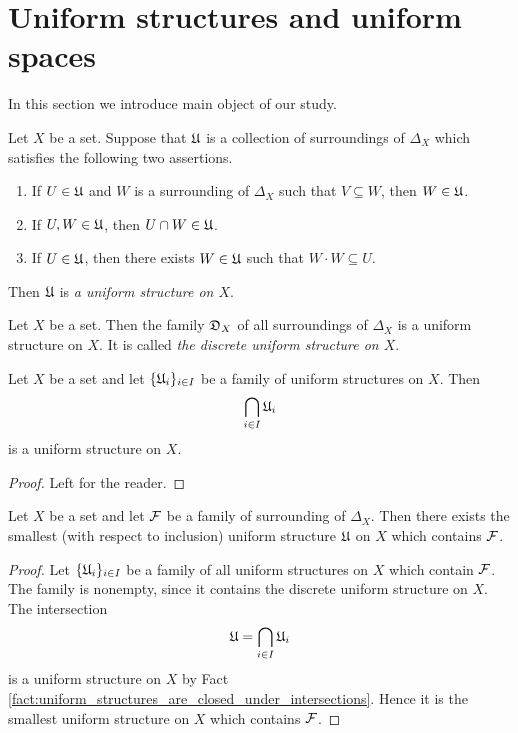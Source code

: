 \section{Uniform structures and uniform spaces}
\noindent
In this section we introduce main object of our study.

\begin{definition}
Let $X$ be a set. Suppose that ${\mathfrak U}$ is a collection of surroundings of $\Delta_X$ which satisfies the following two assertions.
\begin{enumerate}[label=\textbf{(\arabic*)}, leftmargin=*]
\item If $U \in {\mathfrak U}$ and $W$ is a surrounding of $\Delta_X$ such that $V\subseteq W$, then $W\in {\mathfrak U}$.
\item If $U,W\in {\mathfrak U}$, then $U\cap W \in {\mathfrak U}$. 
\item If $U \in {\mathfrak U}$, then there exists $W\in {\mathfrak U}$ such that $W\cdot W \subseteq U$.
\end{enumerate}
Then ${\mathfrak U}$ is \textit{a uniform structure on $X$}.
\end{definition}

\begin{example}\label{example:discrete_uniform_structure}
Let $X$ be a set. Then the family ${\mathfrak D}_X$ of all surroundings of $\Delta_X$ is a uniform structure on $X$. It is called \textit{the discrete uniform structure on $X$}.
\end{example}

\begin{fact}\label{fact:uniform_structures_are_closed_under_intersections}
Let $X$ be a set and let $\{{\mathfrak U}_i\}_{i\in I}$ be a family of uniform structures on $X$. Then 
$$\bigcap_{i\in I}{\mathfrak U}_i$$
is a uniform structure on $X$.
\end{fact}
\begin{proof}
Left for the reader.
\end{proof}

\begin{corollary}\label{corollary:smallest_uniform_structure_containing_given_family_of_surroundings}
Let $X$ be a set and let ${\mathcal F}$ be a family of surrounding of $\Delta_X$. Then there exists the smallest (with respect to inclusion) uniform structure ${\mathfrak U}$ on $X$ which contains ${\mathcal F}$.
\end{corollary}
\begin{proof}
Let $\{{\mathfrak U}_i\}_{i\in I}$ be a family of all uniform structures on $X$ which contain ${\mathcal F}$. The family is nonempty, since it contains the discrete uniform structure on $X$. The intersection $${\mathfrak U} = \bigcap_{i\in I}{\mathfrak U}_i$$
is a uniform structure on $X$ by Fact \ref{fact:uniform_structures_are_closed_under_intersections}. Hence it is the smallest uniform structure on $X$ which contains ${\mathcal F}$.
\end{proof}

